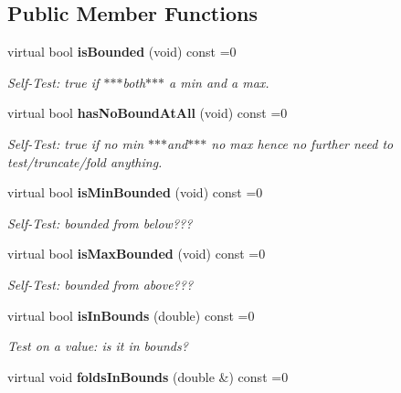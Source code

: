 \subsection*{Public Member Functions}
\begin{CompactItemize}
\item 
virtual bool {\bf is\-Bounded} (void) const =0\label{classeo_int_bounds_a1}

\begin{CompactList}\small\item\em Self-Test: true if $\ast$$\ast$$\ast$both$\ast$$\ast$$\ast$ a min and a max. \item\end{CompactList}\item 
virtual bool {\bf has\-No\-Bound\-At\-All} (void) const =0\label{classeo_int_bounds_a2}

\begin{CompactList}\small\item\em Self-Test: true if no min $\ast$$\ast$$\ast$and$\ast$$\ast$$\ast$ no max hence no further need to test/truncate/fold anything. \item\end{CompactList}\item 
virtual bool {\bf is\-Min\-Bounded} (void) const =0\label{classeo_int_bounds_a3}

\begin{CompactList}\small\item\em Self-Test: bounded from below??? \item\end{CompactList}\item 
virtual bool {\bf is\-Max\-Bounded} (void) const =0\label{classeo_int_bounds_a4}

\begin{CompactList}\small\item\em Self-Test: bounded from above??? \item\end{CompactList}\item 
virtual bool {\bf is\-In\-Bounds} (double) const =0\label{classeo_int_bounds_a5}

\begin{CompactList}\small\item\em Test on a value: is it in bounds? \item\end{CompactList}\item 
virtual void {\bf folds\-In\-Bounds} (double \&) const =0\label{classeo_int_bounds_a6}


\end{CompactItemize}

